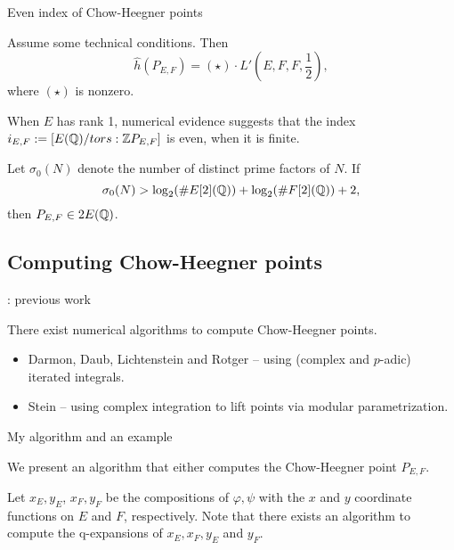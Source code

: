 \documentclass[handout]{beamer}
\begin{document}
\begin{frame}{Even index of Chow-Heegner points}

\begin{theorem}
Assume some technical conditions. Then 
\[
	\hat{h}(P_{E,F}) = (\star) \cdot L'(E,F,F,\frac{1}{2}),
\]
where $(\star)$ is nonzero.
\end{theorem}


When $E$ has rank 1, numerical evidence suggests that the index $i_{E,F} := [E(\mathbb{Q})/tors: \mathbb{Z} P_{E,F}]$ is even, 
when it is finite. 
\begin{theorem}[C.]
Let $\sigma_0(N)$ denote the number of distinct prime factors of $N$. If 
\[
	\sigma_0(N) > \log_2(\# E[2](\mathbb{Q})) + \log_2(\# F[2](\mathbb{Q})) + 2,
\]
then $P_{E,F} \in 2E(\mathbb{Q})$. 
\end{theorem}
\end{frame}

\subsection{Computing Chow-Heegner points}

\begin{frame}{\insertsubsection : previous work}

There exist numerical algorithms to compute Chow-Heegner points.  

\medskip 

\begin{itemize}
\item Darmon, Daub, Lichtenstein and Rotger -- using (complex and $p$-adic) iterated integrals. 
\item Stein  -- using complex integration to lift points via modular parametrization. 
\end{itemize}



\end{frame}

\begin{frame}{My algorithm and an example}

We present an algorithm that either computes the Chow-Heegner point $P_{E,F}$. 

\pause 
\medskip

 Let $x_E, y_E$, $x_F,y_F$ be the compositions of $\varphi, \psi$ with the $x$ and $y$ coordinate functions on $E$ and $F$, respectively. Note that there exists an algorithm to compute the q-expansions of $x_E,x_F,y_E$ and $y_F$.  

\end{frame}
\end{document}
